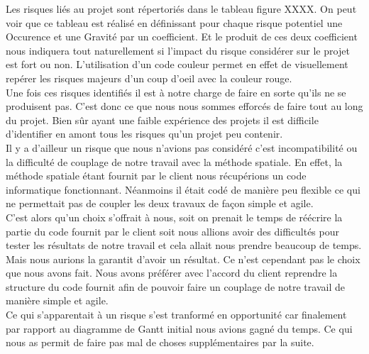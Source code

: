 \documentclass[a4paper,12pt]{report}
\theoremstyle{break}
\begin{document}
  Les risques liés au projet sont répertoriés dans le tableau figure XXXX. On peut voir que ce tableau est réalisé en définissant pour chaque risque potentiel une Occurence et une Gravité par un coefficient. Et le produit de ces deux coefficient nous indiquera tout naturellement si l'impact du risque considérer sur le projet est fort ou non. L'utilisation d'un code couleur permet en effet de visuellement repérer les risques majeurs d'un coup d'oeil avec la couleur rouge. \\
  
  Une fois ces risques identifiés il est à notre charge de faire en sorte qu'ils ne se produisent pas. C'est donc ce que nous nous sommes efforcés de faire tout au long du projet. Bien sûr ayant une faible expérience des projets il est difficile d'identifier en amont tous les risques qu'un projet peu contenir. \\
  
  Il y a d'ailleur un risque que nous n’avions pas considéré c’est incompatibilité ou la difficulté de couplage de notre travail avec la méthode spatiale. En effet, la méthode spatiale étant fournit par le client nous récupérions un code informatique fonctionnant. Néanmoins il était codé de manière peu flexible ce qui ne permettait pas de coupler les deux travaux de façon simple et agile.\\
  
 C'est alors qu'un choix s'offrait à nous, soit on prenait le temps de réécrire la partie du code fournit par le client soit nous allions avoir des difficultés pour tester les résultats de notre travail et cela allait nous prendre beaucoup de temps. Mais nous aurions la garantit d'avoir un résultat. Ce n'est cependant pas le choix que nous avons fait. Nous avons préférer avec l'accord du client reprendre la structure du code fournit afin de pouvoir faire un couplage de notre travail de manière simple et agile. \\ 
 
 Ce qui s'apparentait à un risque s'est tranformé en opportunité car finalement par rapport au diagramme de Gantt initial nous avions gagné du temps. Ce qui nous as permit de faire pas mal de choses supplémentaires par la suite.
\end{document}
